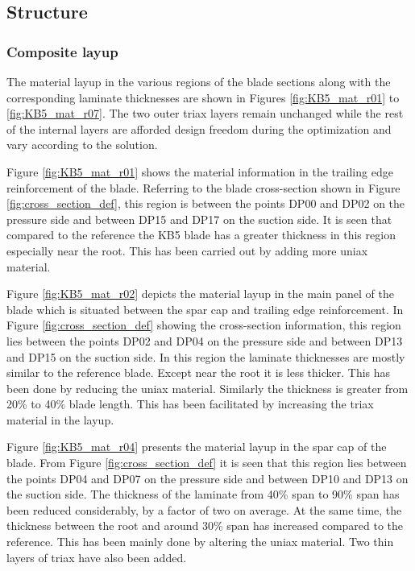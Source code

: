 \subsection{Structure}
\label{subsec:KB5_structure}

\subsubsection*{Composite layup}
The material layup in the various regions of the blade sections along with the corresponding laminate thicknesses are shown in Figures \ref{fig:KB5_mat_r01} to \ref{fig:KB5_mat_r07}. The two outer triax layers remain unchanged while the rest of the internal layers are afforded design freedom during the optimization and vary according to the solution. 

Figure \ref{fig:KB5_mat_r01} shows the material information in the trailing edge reinforcement of the blade. Referring to the blade cross-section shown in Figure \ref{fig:cross_section_def}, this region is between the points DP00 and DP02 on the pressure side and between DP15 and DP17 on the suction side. It is seen that compared to the reference the KB5 blade has a greater thickness in this region especially near the root. This has been carried out by adding more uniax material.

Figure \ref{fig:KB5_mat_r02} depicts the material layup in the main panel of the blade which is situated between the spar cap and trailing edge reinforcement. In Figure \ref{fig:cross_section_def} showing the cross-section information, this region lies between the points DP02 and DP04 on the pressure side and between DP13 and DP15 on the suction side. In this region the laminate thicknesses are mostly similar to the reference blade. Except near the root it is less thicker. This has been done by reducing the uniax material. Similarly the thickness is greater from 20\% to 40\% blade length. This has been facilitated by increasing the triax material in the layup. 

Figure \ref{fig:KB5_mat_r04} presents the material layup in the spar cap of the blade. From Figure \ref{fig:cross_section_def} it is seen that this region lies between the points DP04 and DP07 on the pressure side and between DP10 and DP13 on the suction side. The thickness of the laminate from 40\% span to 90\% span has been reduced considerably, by a factor of two on average. At the same time, the thickness between the root and around 30\% span has increased compared to the reference. This has been mainly done by altering the uniax material. Two thin layers of triax have also been added.

